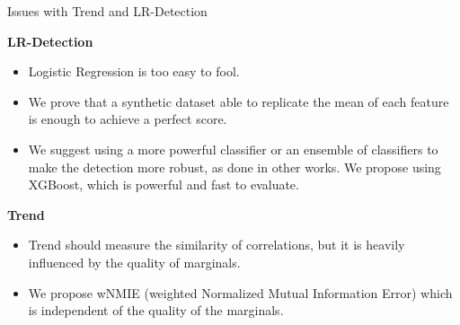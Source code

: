 \begin{frame}[fragile]{Issues with Trend and LR-Detection}

    \textbf{LR-Detection}
    \begin{itemize}
        \item Logistic Regression is too easy to fool.
        \item We prove that a synthetic dataset able to replicate the mean of each feature is enough to achieve a perfect score.
        \item We suggest using a more powerful classifier or an ensemble of classifiers to make the detection more robust, as done in other works.
        We propose using XGBoost, which is powerful and fast to evaluate.
    \end{itemize}

    \textbf{Trend}
    \begin{itemize}
        \item Trend should measure the similarity of correlations, but it is heavily influenced by the quality of marginals.
        \item We propose wNMIE (weighted Normalized Mutual Information Error) which is independent of the quality of the marginals.%
    \end{itemize}

\end{frame}



